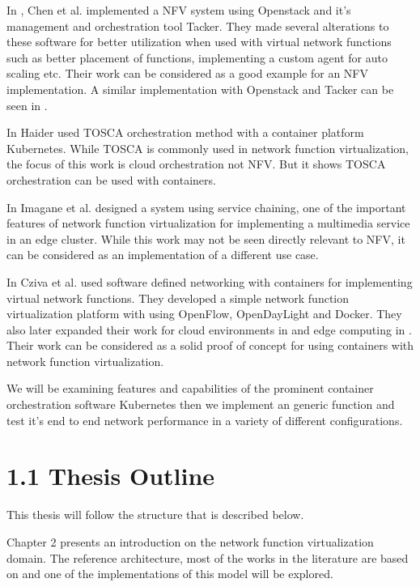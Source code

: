 \documentclass[12pt,oneandhalf,chaparabic,ceng,ms,eng,oneside,pntc]{gsufbe}
\begin{document}
In \cite{chen_implementing_2017}, Chen et al.  implemented a NFV system using Openstack and it's
management and orchestration tool Tacker.  They made several alterations to these software for better
utilization when used with virtual network functions such as better placement of functions, implementing
a custom agent for auto scaling etc.  Their work can be considered as a good example for an NFV
implementation.  A similar implementation with Openstack and Tacker can be seen in \cite{tahir_master}.

In \cite{haider_md_rezzakul_deployment_2017} Haider used TOSCA orchestration method with a container
platform Kubernetes.  While TOSCA is commonly used in network function virtualization, the focus of this
work is cloud orchestration not NFV.  But it shows TOSCA orchestration can be used with containers.

In \cite{imagane_performance_2018} Imagane et al.  designed a system using service chaining, one of the
important features of network function virtualization for implementing a multimedia service in an edge
cluster.  While this work may not be seen directly relevant to NFV, it can be considered as an
implementation of a different use case.

In \cite{cziva_container-based_2015} Cziva et al.  used software defined networking with containers for
implementing virtual network functions.  They developed a simple network function virtualization platform
with using OpenFlow, OpenDayLight and Docker.  They also later expanded their work for cloud environments
in \cite{cziva_gnfc_2015} and edge computing in \cite{cziva_container_2017}.  Their work can be 
considered as a solid proof of concept for using containers with network function virtualization.

We will be examining features and capabilities of the prominent
container orchestration software Kubernetes then we implement an generic function and test it's
end to end network performance in a variety of different configurations. 


\section[Thesis Outline]{1.1 Thesis Outline}
This thesis will follow the structure that is described below.

Chapter 2 presents an introduction on the network function virtualization domain.  The reference
architecture, most of the works in the literature are based on and one of the implementations of this
model will be explored.
\end{document}
